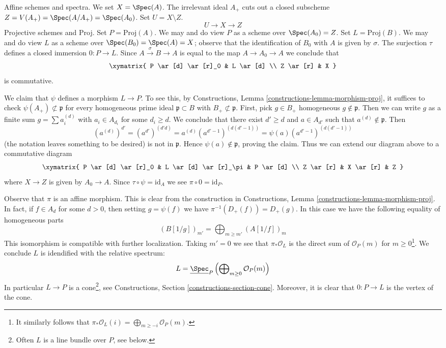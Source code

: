 \medskip\noindent
Affine schemes and spectra.
We set $X = \Spec(A)$. The irrelevant ideal $A_+$ cuts out a closed subscheme
$Z = V(A_+) = \Spec(A/A_+) = \Spec(A_0)$. Set $U = X \setminus Z$.
$$
U \longrightarrow X \longrightarrow Z
$$
Projective schemes and Proj. Set $P = \text{Proj}(A)$. We may
and do view $P$ as a scheme over $\Spec(A_0) = Z$.
Set $L = \text{Proj}(B)$. We may and do view $L$ as a scheme
over $\Spec(B_0) = \Spec(A) = X$; observe that the identification
of $B_0$ with $A$ is given by $\sigma$.
The surjection $\tau$ defines a closed immersion $0 : P \to L$.
Since $A \xrightarrow{\sigma} B \to A$ is equal to the map $A \to A_0 \to A$
we conclude that
$$
\xymatrix{
P \ar[d] \ar[r]_0 & L \ar[d] \\
Z \ar[r] & X
}
$$
is commutative.

\medskip\noindent
We claim that $\psi$ defines a morphism $L \to P$.
To see this, by Constructions, Lemma \ref{constructions-lemma-morphism-proj},
it suffices to check $\psi(A_+) \not \subset \mathfrak p$ for
every homogeneous prime ideal
$\mathfrak p \subset B$ with $B_+ \not \subset \mathfrak p$.
First, pick $g \in B_+$ homogeneous $g \not \in \mathfrak p$.
Then we can write $g$ as a finite sum $g = \sum a_i^{(d)}$
with $a_i \in A_{d_i}$ for some $d_i \geq d$.
We conclude that there exist $d' \geq d$ and $a \in A_{d'}$
such that $a^{(d)} \not \in \mathfrak p$.
Then
$$
(a^{(d)})^{d'} =
(a^{d'})^{(d'd)} =
a^{(d)} (a^{d' - 1})^{(d(d' - 1))} =
\psi(a) (a^{d' - 1})^{(d(d' - 1))}
$$
(the notation leaves something to be desired) is not in $\mathfrak p$.
Hence $\psi(a) \not \in \mathfrak p$, proving the claim.
Thus we can extend our diagram above to a commutative diagram
$$
\xymatrix{
P \ar[d] \ar[r]_0 & L \ar[d] \ar[r]_\pi & P \ar[d] \\
Z \ar[r] & X \ar[r] & Z
}
$$
where $X \to Z$ is given by $A_0 \to A$.
Since $\tau \circ \psi = \text{id}_A$ we see $\pi \circ 0 = \text{id}_P$.

\medskip\noindent
Observe that $\pi$ is an affine morphism. This is clear from the construction
in Constructions, Lemma \ref{constructions-lemma-morphism-proj}. In fact, if
$f \in A_d$ for some $d > 0$, then
setting $g = \psi(f)$ we have $\pi^{-1}(D_+(f)) = D_+(g)$.
In this case we have the following equality of homogeneous parts
$$
(B[1/g])_{m'} = \bigoplus\nolimits_{m \geq m'} (A[1/f])_m
$$
This isomorphism is compatible with further localization.
Taking $m' = 0$ we see that $\pi_*\mathcal{O}_L$ is the
direct sum of $\mathcal{O}_P(m)$ for $m \geq 0$\footnote{It similarly follows
that $\pi_*\mathcal{O}_L(i) = \bigoplus_{m \geq -i} \mathcal{O}_P(m)$.}.
We conclude $L$ is idendified with the relative spectrum:
$$
L = \underline{\Spec}_P
\left(
\bigoplus\nolimits_{m \geq 0} \mathcal{O}_P(m)
\right)
$$
In particular $L \to P$ is a cone\footnote{Often $L$ is a line bundle
over $P$, see below.}, see
Constructions, Section \ref{constructions-section-cone}.
Moreover, it is clear that $0 : P \to L$ is the vertex of the cone.

